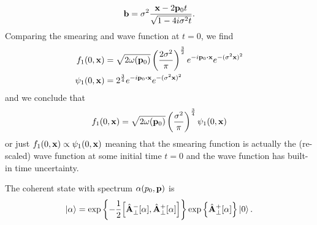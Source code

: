 \begin{example}
\begin{equation*}
		\vb{b}
		=
		\sigma^2
		\frac{\vb{x}-2\vb{p}_0t}{\sqrt{1-4i\sigma^2t}}
		.
	\end{equation*}
	Comparing the smearing and wave function at $t=0$, we find
	\begin{align*}
		f_1(0,\vb{x})
		&=
		\sqrt{2\omega(\vb{p}_0)}
		\left(\frac{2\sigma^2}{\pi}\right)^\frac{3}{2}
		e^{-i\vb{p}_0\vdot\vb{x}}
		e^{-(\sigma^2\vb{x})^2}
		\\
		\psi_1(0,\vb{x})
		&=
		2^\frac{3}{4}
		e^{-i\vb{p}_0\vdot\vb{x}}
		e^{-(\sigma^2\vb{x})^2}
	\end{align*}
	and we conclude that
	\begin{equation*}
		f_1(0,\vb{x})
		=
		\sqrt{2\omega(\vb{p}_0)}
		\left(\frac{\sigma^2}{\pi}\right)^\frac{3}{4}
		\psi_1(0,\vb{x})
	\end{equation*}
	or just $f_1(0,\vb{x})\propto\psi_1(0,\vb{x})$ meaning that the smearing function is actually the (re-scaled) wave function at some initial time $t=0$ and the wave function has built-in time uncertainty.
\end{example}

\begin{definition}
	The coherent state with spectrum $\vb{\alpha}(p_0,\vb{p})$ is
	\begin{equation}
		\label{eq:qmw_coherent_state}
		\ket{\vb{\alpha}}
		=
		\exp\left\{
			-
			\frac{1}{2}
			\comm{\hat{\vb{A}}_\perp^-[\vb{\alpha}]}{\hat{\vb{A}}_\perp^+[\vb{\alpha}]}
		\right\}
		\exp\left\{
			\hat{\vb{A}}_\perp^+[\vb{\alpha}]
		\right\}
		\ket{0}
		.
	\end{equation}
\end{definition}